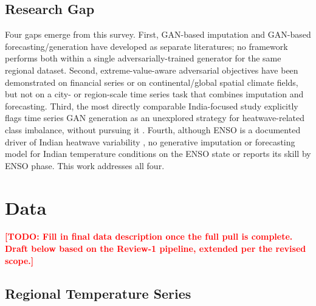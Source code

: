 \documentclass[conference]{IEEEtran}
\newcommand{\TODO}[1]{\textcolor{red}{\textbf{[TODO: #1]}}}
\begin{document}
\subsection{Research Gap}

Four gaps emerge from this survey. First, GAN-based imputation and GAN-based forecasting/generation
have developed as separate literatures; no framework performs both within a single
adversarially-trained generator for the same regional dataset. Second, extreme-value-aware adversarial
objectives have been demonstrated on financial series or on continental/global spatial climate fields,
but not on a city- or region-scale time series task that combines imputation and forecasting. Third,
the most directly comparable India-focused study explicitly flags time series GAN generation as an
unexplored strategy for heatwave-related class imbalance, without pursuing it
\cite{choudary2025comparative}. Fourth, although ENSO is a documented driver of Indian heatwave
variability \cite{rohini2016variability,ratnam2016anatomy}, no generative imputation or forecasting
model for Indian temperature conditions on the ENSO state or reports its skill by ENSO phase. This work
addresses all four.

\section{Data}
\label{sec:data}

\TODO{Fill in final data description once the full pull is complete. Draft below based on the
Review-1 pipeline, extended per the revised scope.}

\subsection{Regional Temperature Series}
\end{document}
